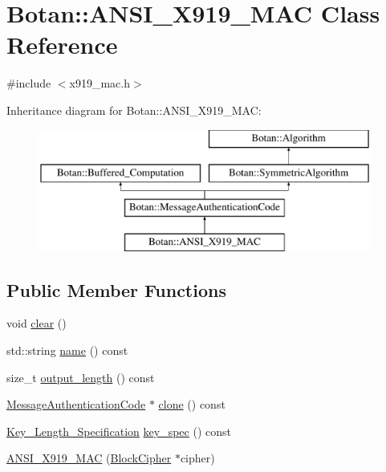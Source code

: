 \hypertarget{classBotan_1_1ANSI__X919__MAC}{\section{Botan\-:\-:A\-N\-S\-I\-\_\-\-X919\-\_\-\-M\-A\-C Class Reference}
\label{classBotan_1_1ANSI__X919__MAC}
}


{\ttfamily \#include $<$x919\-\_\-mac.\-h$>$}

Inheritance diagram for Botan\-:\-:A\-N\-S\-I\-\_\-\-X919\-\_\-\-M\-A\-C\-:\begin{figure}[H]
\begin{center}
\leavevmode
\includegraphics[height=4.000000cm]{classBotan_1_1ANSI__X919__MAC}
\end{center}
\end{figure}
\subsection*{Public Member Functions}
\begin{DoxyCompactItemize}
\item 
void \hyperlink{classBotan_1_1ANSI__X919__MAC_a9832169ac47ee97a7ec86d80917900e7}{clear} ()
\item 
std\-::string \hyperlink{classBotan_1_1ANSI__X919__MAC_a659553433b921b5712acdec71f324a53}{name} () const 
\item 
size\-\_\-t \hyperlink{classBotan_1_1ANSI__X919__MAC_a9785067cf34466eaf05dd86fbd860f63}{output\-\_\-length} () const 
\item 
\hyperlink{classBotan_1_1MessageAuthenticationCode}{Message\-Authentication\-Code} $\ast$ \hyperlink{classBotan_1_1ANSI__X919__MAC_a2112de3be3b9c23417c93b11e7969657}{clone} () const 
\item 
\hyperlink{classBotan_1_1Key__Length__Specification}{Key\-\_\-\-Length\-\_\-\-Specification} \hyperlink{classBotan_1_1ANSI__X919__MAC_ae2c8581782a4c36f4e5339e2c342110a}{key\-\_\-spec} () const 
\item 
\hyperlink{classBotan_1_1ANSI__X919__MAC_a3bcb5fa585b06d8438a424a205c3aa44}{A\-N\-S\-I\-\_\-\-X919\-\_\-\-M\-A\-C} (\hyperlink{classBotan_1_1BlockCipher}{Block\-Cipher} $\ast$cipher)
\end{DoxyCompactItemize}


